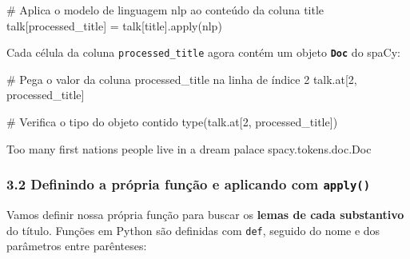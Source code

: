 \documentclass[
  brazilian,
  11pt,
]{article}
\newenvironment{Shaded}{\begin{snugshade}}{\end{snugshade}}
\newcommand{\BuiltInTok}[1]{\textcolor[rgb]{0.50,0.55,0.55}{#1}}
\newcommand{\CommentTok}[1]{\textcolor[rgb]{0.48,0.49,0.49}{#1}}
\newcommand{\DecValTok}[1]{\textcolor[rgb]{0.96,0.45,0.00}{#1}}
\newcommand{\NormalTok}[1]{\textcolor[rgb]{0.81,0.81,0.76}{#1}}
\newcommand{\OperatorTok}[1]{\textcolor[rgb]{0.81,0.81,0.76}{#1}}
\newcommand{\StringTok}[1]{\textcolor[rgb]{0.96,0.31,0.31}{#1}}
\let\oldtexttt\texttt
\renewcommand{\texttt}[1]{{\color{inlink}\oldtexttt{#1}}}
\begin{document}
\begin{Shaded}
\begin{Highlighting}[]
\CommentTok{\# Aplica o modelo de linguagem \textquotesingle{}nlp\textquotesingle{} ao conteúdo da coluna \textquotesingle{}title\textquotesingle{}}
\NormalTok{talk[}\StringTok{\textquotesingle{}processed\_title\textquotesingle{}}\NormalTok{] }\OperatorTok{=}\NormalTok{ talk[}\StringTok{\textquotesingle{}title\textquotesingle{}}\NormalTok{].}\BuiltInTok{apply}\NormalTok{(nlp)}
\end{Highlighting}
\end{Shaded}

Cada célula da coluna \texttt{processed\_title} agora contém um objeto
\textbf{\texttt{Doc}} do spaCy:

\begin{Shaded}
\begin{Highlighting}[]
\CommentTok{\# Pega o valor da coluna \textquotesingle{}processed\_title\textquotesingle{} na linha de índice 2}
\NormalTok{talk.at[}\DecValTok{2}\NormalTok{, }\StringTok{\textquotesingle{}processed\_title\textquotesingle{}}\NormalTok{]}

\CommentTok{\# Verifica o tipo do objeto contido}
\BuiltInTok{type}\NormalTok{(talk.at[}\DecValTok{2}\NormalTok{, }\StringTok{\textquotesingle{}processed\_title\textquotesingle{}}\NormalTok{])}
\end{Highlighting}
\end{Shaded}

\begin{Shaded}
\begin{Highlighting}[]
\NormalTok{Too many first nations people live in a dream palace}
\NormalTok{spacy.tokens.doc.Doc}
\end{Highlighting}
\end{Shaded}

\subsubsection{\texorpdfstring{3.2 Definindo a própria função e
aplicando com
\texttt{apply()}}{3.2 Definindo a própria função e aplicando com apply()}}\label{definindo-a-pruxf3pria-funuxe7uxe3o-e-aplicando-com-apply}

Vamos definir nossa própria função para buscar os \textbf{lemas de cada
substantivo} do título. Funções em Python são definidas com
\texttt{def}, seguido do nome e dos parâmetros entre parênteses:
\end{document}
